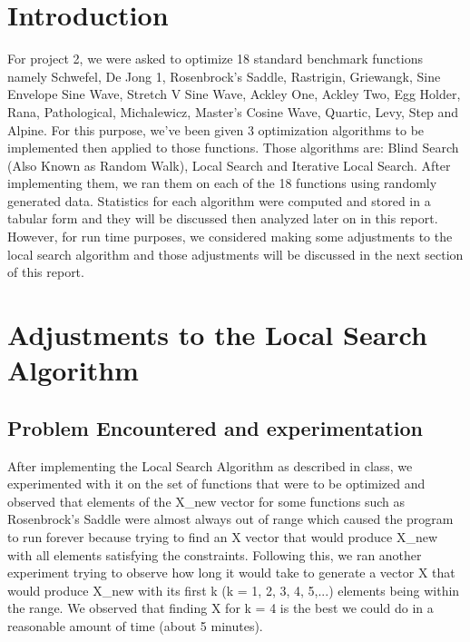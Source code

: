 \documentclass[12pt]{article}
\begin{document}
	\section{Introduction}
	For project 2, we were asked to optimize 18 standard benchmark functions namely Schwefel, De Jong 1, Rosenbrock's Saddle, Rastrigin, Griewangk, Sine Envelope Sine Wave, Stretch V Sine Wave, Ackley One, Ackley Two, Egg Holder, Rana, Pathological, Michalewicz, Master's Cosine Wave, Quartic, Levy, Step and Alpine. For this purpose, we've been given 3 optimization algorithms to be implemented then applied to those functions. Those algorithms are: Blind Search (Also Known as Random Walk), Local Search and Iterative Local Search. After implementing them, we ran them on each of the 18 functions using randomly generated data. Statistics for each algorithm were computed and stored in a tabular form and they will be discussed then analyzed later on in this report. However, for run time purposes, we considered making some adjustments to the local search algorithm and those adjustments will be discussed in the next section of this report.
	
	\section{Adjustments to the Local Search Algorithm}
		\subsection{Problem Encountered and experimentation}
			After implementing the Local Search Algorithm as described in class, we experimented with it on the set of functions that were to be optimized and observed that elements of the X\_new vector for some functions such as Rosenbrock's Saddle were almost always out of range which caused the program to run forever because trying to find an X vector that would produce X\_new with all elements satisfying the constraints. Following this, we ran another experiment trying to observe how  long it would take to generate a vector X that would produce X\_new with its first k (k = 1, 2, 3, 4, 5,...) elements being within the range. We observed that finding X for k = 4 is the best we could do in a reasonable amount of time (about 5 minutes).
\end{document}
